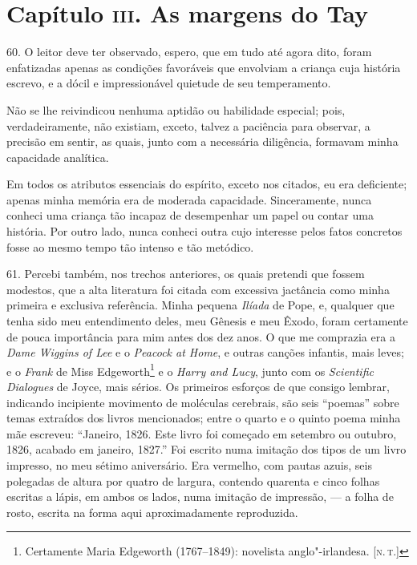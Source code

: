 \chapter{Capítulo \textsc{iii}. As margens do Tay}

60. O leitor deve ter observado, espero, que em tudo até agora dito,
foram enfatizadas apenas as condições favoráveis que envolviam a criança
cuja história escrevo, e a dócil e impressionável quietude de seu
temperamento.

Não se lhe reivindicou nenhuma aptidão ou habilidade especial; pois,
verdadeiramente, não existiam, exceto, talvez a paciência para observar,
a precisão em sentir, as quais, junto com a necessária diligência,
formavam minha capacidade analítica.

Em todos os atributos essenciais do espírito, exceto nos citados, eu era
deficiente; apenas minha memória era de moderada capacidade.
Sinceramente, nunca conheci uma criança tão incapaz de desempenhar um
papel ou contar uma história. Por outro lado, nunca conheci outra cujo
interesse pelos fatos concretos fosse ao mesmo tempo tão intenso e tão
metódico.

61. Percebi também, nos trechos anteriores, os quais pretendi que fossem
modestos, que a alta literatura foi citada com excessiva jactância como
minha primeira e exclusiva referência. Minha pequena \emph{Ilíada} de
Pope, e, qualquer que tenha sido meu entendimento deles, meu Gênesis e
meu Êxodo, foram certamente de pouca importância para mim antes dos dez
anos. O que me comprazia era a \emph{Dame Wiggins of Lee} e o
\emph{Peacock at Home}, e outras canções infantis, mais leves; e o
\emph{Frank} de Miss Edgeworth\footnote{Certamente Maria Edgeworth
  (1767--1849): novelista anglo"-irlandesa. {[}\textsc{n.\,t.}{]}} e o
\emph{Harry and Lucy}, junto com os \emph{Scientific} \emph{Dialogues}
de Joyce, mais sérios. Os primeiros esforços de que consigo lembrar,
indicando incipiente movimento de moléculas cerebrais, são seis
``poemas'' sobre temas extraídos dos livros mencionados; entre o quarto
e o quinto poema minha mãe escreveu: ``Janeiro, 1826. Este livro foi
começado em setembro ou outubro, 1826, acabado em janeiro, 1827.'' Foi
escrito numa imitação dos tipos de um livro impresso, no meu sétimo
aniversário. Era vermelho, com pautas azuis, seis polegadas de altura
por quatro de largura, contendo quarenta e cinco folhas escritas a
lápis, em ambos os lados, numa imitação de impressão, --- a folha de
rosto, escrita na forma aqui aproximadamente reproduzida.

